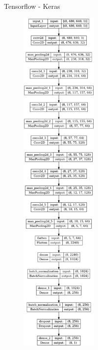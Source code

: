 \documentclass[aspectratio=169]{beamer}
\begin{document}
\begin{frame}{Tensorflow - Keras}
\begin{figure}
        \includegraphics[trim={0 25.5cm 0 25.5cm},clip,width=3.8cm]{model_plot.png} \hfill

\end{figure}
\end{frame}
\end{document}
